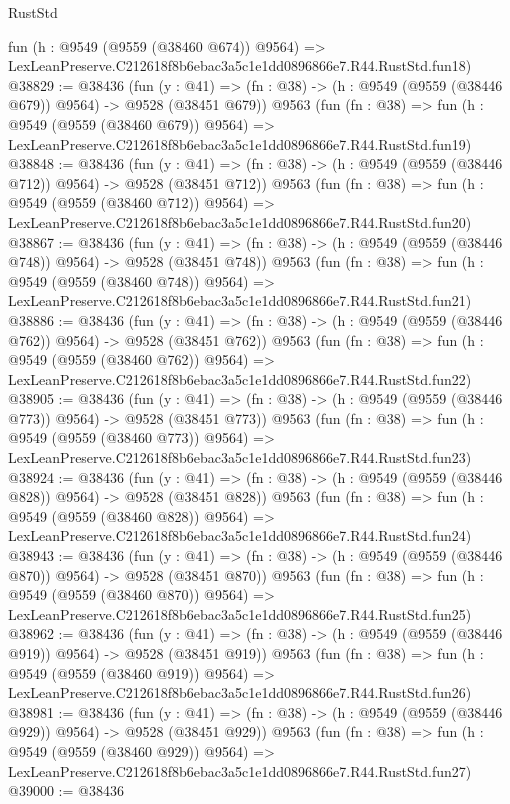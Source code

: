 \begin{lexlean}{RustStd}
\begin{coremodule}
    fun (h : @9549 (@9559 (@38460 @674)) @9564) =>
    LexLeanPreserve.C212618f8b6ebac3a5c1e1dd0896866e7.R44.RustStd.fun18)
@38829 := @38436
    (fun (y : @41) => (fn : @38) -> (h : @9549 (@9559 (@38446 @679)) @9564) -> @9528 (@38451 @679))
    @9563
    (fun (fn : @38) =>
    fun (h : @9549 (@9559 (@38460 @679)) @9564) =>
    LexLeanPreserve.C212618f8b6ebac3a5c1e1dd0896866e7.R44.RustStd.fun19)
@38848 := @38436
    (fun (y : @41) => (fn : @38) -> (h : @9549 (@9559 (@38446 @712)) @9564) -> @9528 (@38451 @712))
    @9563
    (fun (fn : @38) =>
    fun (h : @9549 (@9559 (@38460 @712)) @9564) =>
    LexLeanPreserve.C212618f8b6ebac3a5c1e1dd0896866e7.R44.RustStd.fun20)
@38867 := @38436
    (fun (y : @41) => (fn : @38) -> (h : @9549 (@9559 (@38446 @748)) @9564) -> @9528 (@38451 @748))
    @9563
    (fun (fn : @38) =>
    fun (h : @9549 (@9559 (@38460 @748)) @9564) =>
    LexLeanPreserve.C212618f8b6ebac3a5c1e1dd0896866e7.R44.RustStd.fun21)
@38886 := @38436
    (fun (y : @41) => (fn : @38) -> (h : @9549 (@9559 (@38446 @762)) @9564) -> @9528 (@38451 @762))
    @9563
    (fun (fn : @38) =>
    fun (h : @9549 (@9559 (@38460 @762)) @9564) =>
    LexLeanPreserve.C212618f8b6ebac3a5c1e1dd0896866e7.R44.RustStd.fun22)
@38905 := @38436
    (fun (y : @41) => (fn : @38) -> (h : @9549 (@9559 (@38446 @773)) @9564) -> @9528 (@38451 @773))
    @9563
    (fun (fn : @38) =>
    fun (h : @9549 (@9559 (@38460 @773)) @9564) =>
    LexLeanPreserve.C212618f8b6ebac3a5c1e1dd0896866e7.R44.RustStd.fun23)
@38924 := @38436
    (fun (y : @41) => (fn : @38) -> (h : @9549 (@9559 (@38446 @828)) @9564) -> @9528 (@38451 @828))
    @9563
    (fun (fn : @38) =>
    fun (h : @9549 (@9559 (@38460 @828)) @9564) =>
    LexLeanPreserve.C212618f8b6ebac3a5c1e1dd0896866e7.R44.RustStd.fun24)
@38943 := @38436
    (fun (y : @41) => (fn : @38) -> (h : @9549 (@9559 (@38446 @870)) @9564) -> @9528 (@38451 @870))
    @9563
    (fun (fn : @38) =>
    fun (h : @9549 (@9559 (@38460 @870)) @9564) =>
    LexLeanPreserve.C212618f8b6ebac3a5c1e1dd0896866e7.R44.RustStd.fun25)
@38962 := @38436
    (fun (y : @41) => (fn : @38) -> (h : @9549 (@9559 (@38446 @919)) @9564) -> @9528 (@38451 @919))
    @9563
    (fun (fn : @38) =>
    fun (h : @9549 (@9559 (@38460 @919)) @9564) =>
    LexLeanPreserve.C212618f8b6ebac3a5c1e1dd0896866e7.R44.RustStd.fun26)
@38981 := @38436
    (fun (y : @41) => (fn : @38) -> (h : @9549 (@9559 (@38446 @929)) @9564) -> @9528 (@38451 @929))
    @9563
    (fun (fn : @38) =>
    fun (h : @9549 (@9559 (@38460 @929)) @9564) =>
    LexLeanPreserve.C212618f8b6ebac3a5c1e1dd0896866e7.R44.RustStd.fun27)
@39000 := @38436

\end{coremodule}
\end{lexlean}
